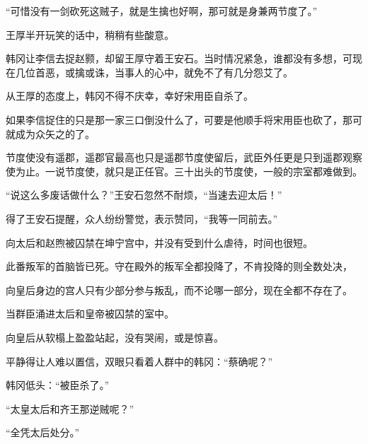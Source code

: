“可惜没有一剑砍死这贼子，就是生擒也好啊，那可就是身兼两节度了。”

王厚半开玩笑的话中，稍稍有些酸意。

韩冈让李信去捉赵颢，却留王厚守着王安石。当时情况紧急，谁都没有多想，可现在几位首恶，或擒或诛，当事人的心中，就免不了有几分怨艾了。

从王厚的态度上，韩冈不得不庆幸，幸好宋用臣自杀了。

如果李信捉住的只是那一家三口倒没什么了，可要是他顺手将宋用臣也砍了，那可就成为众矢之的了。

节度使没有遥郡，遥郡官最高也只是遥郡节度使留后，武臣外任更是只到遥郡观察使为止。一说节度使，就只是正任官。三十出头的节度使，一般的宗室都难做到。

“说这么多废话做什么？”王安石忽然不耐烦，“当速去迎太后！”

得了王安石提醒，众人纷纷警觉，表示赞同，“我等一同前去。”

向太后和赵煦被囚禁在坤宁宫中，并没有受到什么虐待，时间也很短。

此番叛军的首脑皆已死。守在殿外的叛军全都投降了，不肯投降的则全数处决，

向皇后身边的宫人只有少部分参与叛乱，而不论哪一部分，现在全都不存在了。

当群臣涌进太后和皇帝被囚禁的室中。

向皇后从软榻上盈盈站起，没有哭闹，或是惊喜。

平静得让人难以置信，双眼只看着人群中的韩冈：“蔡确呢？”

韩冈低头：“被臣杀了。”

“太皇太后和齐王那逆贼呢？”

“全凭太后处分。”


